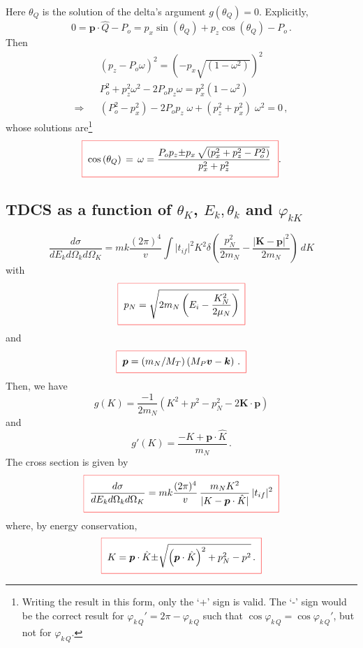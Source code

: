 Here $\theta_Q$ is the solution of the delta's argument $g(\theta_Q) =
0$. Explicitly,
$$
0 =  \bm{p} \cdot \hat{Q} - P_{o} =  p_{x} \sin{(\theta_{Q})} + p_{z}
\cos{(\theta_{Q})}  - P_{o} \nonumber \, .
$$
%
Then
%
\begin{eqnarray*}
&& \left( p_{z} -P_{o} \omega \right)^{2} = \left(- p_{x} \sqrt{(1
- \omega^{2})}\right)^2 \nonumber \\
&& P_{o}^{2} +  p_{z}^{2} \omega^{2} - 2 P_{o} p_{z} \omega = p_{x}^{2}
\left( 1 - \omega^{2}\right) \nonumber \\
\Rightarrow && (P_{o}^{2} - p_{x}^{2}) - 2 P_{o} p_{z} \; \omega +
(p_{z}^{2} + p_{x}^{2}) \; \omega^{2} = 0
  \, ,
\end{eqnarray*}
%
whose solutions are\footnote{Writing the result in this form, only the
`+' sign is valid. The `-' sign would be the correct result for
$\varphi_{k\,Q}' =2 \pi - \varphi_{k\,Q}$ such that
$\cos{\varphi_{k\,Q}}=\cos{\varphi_{k\,Q}'}$, but not for
$\varphi_{k\,Q}$.}
%
$$
\fbeq{\cos{(\theta_Q)}\, = \, \omega = \frac{P_{o} p_{z} {\pm} p_{x} \,
\sqrt{( p_{x}^{2} + p_{z}^{2} - P_{o}^{2} )}}{p_{x}^{2} + p_{z}^{2}}
\,} .
$$

\subsection{TDCS as a function of $\theta_{K}$, $E_{k}, \theta_{k}$
and $\varphi_{kK}$}

$$
\frac{d\sigma}{d E_{k} d\Omega_{k}d \Omega_{K}} = m k
\frac{(2 \pi)^{4}}{v}\int | t_{if}| ^{2} K^{2} \delta\left(
\frac{p^{2}_{N}} {2 m_{N} } - \frac{| \bm{K} - \bm{p}| ^{2}}{2
m_{N} }\right) \ d K
$$
%
with
\begin{equation}\label{Q:pN-defin}
    \fbeq{
p_{N} = \sqrt{2m_{N}\left( E_{i} - \frac{K_{N}^{2}}{2 \mu_{N}} \right)}
    }
\end{equation}
%
and
\begin{equation}\label{Q:p-defin}
   \fbeq{
\bm{p} = \left( m_{N}/M_{T}\right) \left(M_{P} \bm{v} - \bm{k} \right)
\, . }
\end{equation}
%
Then, we have
$$
 g(K) = \frac{-1}{2 m_{N}}\left( K^{2} + p^{2} - p_{N}^{2} - 2 \bm{K}
\cdot \bm{p} \right)
$$
and
$$
  g'(K) = \frac{- K + \bm{p} \cdot \hat{K}}{m_{N}} \,.
$$
%
The cross section is given by
\begin{equation}\label{Q:tdcsK}
    \fbeq{
\frac{d\sigma}{d E_{k} d\Omega_{k}d \Omega_{K}} = m k
\frac{(2 \pi)^{4}}{v} \, \frac{m_{N} K^{2}}{| K - \bm{p} \cdot
\hat{K}| } \, | t_{if}| ^{2}
    }
\end{equation}
%
where, by energy conservation,
\begin{equation}\label{Q:K-kQ}
\fbeq{K = \bm{p} \cdot \hat{K} {\pm} \sqrt{\left( \bm{p} \cdot \hat{K}
\right)^{2} + p_{N}^{2} - p^{2}} \,.
    }
\end{equation}

